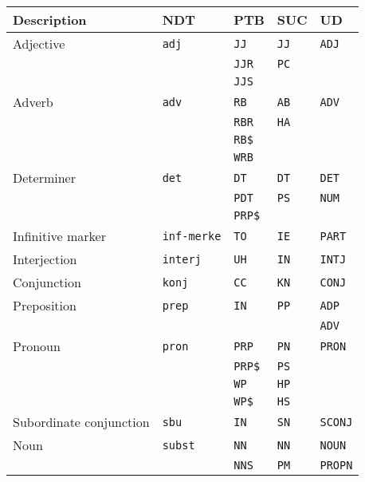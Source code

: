 \documentclass[a4paper,12pt,english]{book}
\begin{document}
\begin{table}
    \centering
    \smaller[0.5]
    \begin{tabular}{lllll}
        \toprule
        \textbf{Description} & \textbf{NDT} & \textbf{PTB} & \textbf{SUC} &
        \textbf{UD} \\
        \midrule
        Adjective & \texttt{adj} & \texttt{JJ} & \texttt{JJ} & \texttt{ADJ} \\
        & & \texttt{JJR} & \texttt{PC} & \\
        & & \texttt{JJS} & & \\
        \midrule
        Adverb & \texttt{adv} & \texttt{RB} & \texttt{AB} & \texttt{ADV} \\
        & & \texttt{RBR} & \texttt{HA} & \\
        & & \texttt{RB\$} & & \\
        & & \texttt{WRB} \\
        \midrule
        Determiner & \texttt{det} & \texttt{DT} & \texttt{DT} & \texttt{DET} \\
        & & \texttt{PDT} & \texttt{PS} & \texttt{NUM} \\
        & & \texttt{PRP\$} & & \\
        \midrule
        Infinitive marker & \texttt{inf-merke} & \texttt{TO} & \texttt{IE} &
        \texttt{PART} \\
        \midrule
        Interjection & \texttt{interj} & \texttt{UH} & \texttt{IN} & \texttt{INTJ} \\
        \midrule
        Conjunction & \texttt{konj} & \texttt{CC} & \texttt{KN} & \texttt{CONJ} \\
        \midrule
        Preposition & \texttt{prep} & \texttt{IN} & \texttt{PP} & \texttt{ADP} \\
        & & & & \texttt{ADV} \\
        \midrule
        Pronoun & \texttt{pron} & \texttt{PRP} & \texttt{PN} & \texttt{PRON} \\
        & & \texttt{PRP\$} & \texttt{PS} & \\
        & & \texttt{WP} & \texttt{HP} & \\
        & & \texttt{WP\$} & \texttt{HS} \\
        \midrule
        Subordinate conjunction & \texttt{sbu} & \texttt{IN} & \texttt{SN} & \texttt{SCONJ} \\
        \midrule
        Noun & \texttt{subst} & \texttt{NN} & \texttt{NN} & \texttt{NOUN} \\
        & & \texttt{NNS} & \texttt{PM} & \texttt{PROPN} \\

\end{tabular}
\end{table}
\end{document}
